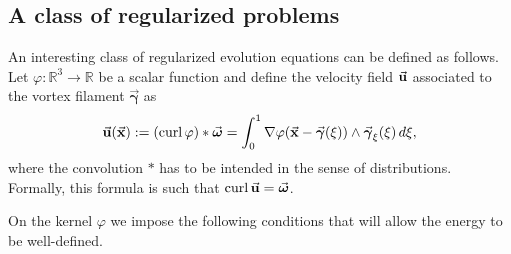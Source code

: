 \documentclass[a4paper,11pt]{article}
\numberwithin{equation}{section}
\DeclareMathOperator{\curl}{curl}
\newcommand{\R}{\mathbb{R}}
\newcommand{\U}{\mbox{$\vec{\bf u}$}}
\newcommand{\bgamma}{\mbox{$\vec{\boldsymbol \gamma}$}}
\newcommand{\vomega}{\mbox{$\vec{\boldsymbol\omega}$}}
\newcommand{\x}{\mbox{$\vec{\bf x}$}}
\begin{document}
\subsection{A class of regularized problems}\label{regularized_problems}
An interesting class of regularized evolution equations can be defined
as follows. Let $\varphi: \R^3 \to \R$ be a scalar function and define
the velocity field $\U$ associated to the vortex filament $\bgamma$ as 
\begin{equation}
  \label{eq:mod-velocity}
\U(\x):= (\curl \varphi) * \vomega = \int_0^1 \nabla
\varphi(\x -\bgamma(\xi)) \wedge \bgamma_\xi(\xi)\,d\xi,  
\end{equation}
where the convolution $*$ has to be intended in the sense of
distributions. Formally, this formula is such that
$\curl\U=\vomega$.\par 
% 
%
On the kernel $\varphi$ we impose the following conditions that will
allow the energy to be well-defined.
\end{document}
